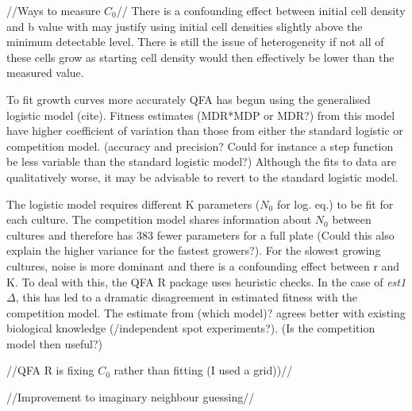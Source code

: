 //Ways to measure \(C_{0}\)// There is a confounding effect between
initial cell density and b value with may justify using initial cell
densities slightly above the minimum detectable level. There is still
the issue of heterogeneity if not all of these cells grow as starting
cell density would then effectively be lower than the measured value.

To fit growth curves more accurately QFA has begun using the
generalised logistic model (cite). Fitness estimates (MDR*MDP or MDR?)
from this model have higher coefficient of variation than those from
either the standard logistic or competition model. (accuracy and
precision? Could for instance a step function be less variable than
the standard logistic model?)  Although the fits to data are
qualitatively worse, it may be advisable to revert to the standard
logistic model.


The logistic model requires different K parameters (\(N_{0}\) for
log. eq.) to be fit for each culture. The competition model shares
information about \(N_{0}\) between cultures and therefore has 383
fewer parameters for a full plate (Could this also explain the higher
variance for the fastest growers?). For the slowest growing cultures,
noise is more dominant and there is a confounding effect between r and
K. To deal with this, the QFA R package uses heuristic checks. In the
case of \textit{est1\(\Delta\)}, this has led to a dramatic
disagreement in estimated fitness with the competition model. The
estimate from (which model)? agrees better with existing biological
knowledge (/independent spot experiments?). (Is the competition model
then useful?)

//QFA R is fixing \(C_{0}\) rather than fitting (I used a grid))//

//Improvement to imaginary neighbour guessing//


